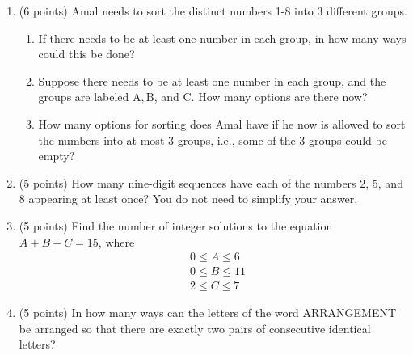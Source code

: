 \documentclass{article}
\begin{document}
\begin{enumerate}
  \item (6 points) Amal needs to sort the distinct numbers 1-8 into 3 different groups.
  \begin{enumerate}
    \item If there needs to be at least one number in each group, in how many ways could this be done?
    \begin{answer}
    \end{answer}
    \item Suppose there needs to be at least one number in each group, and the groups are labeled $\mathrm{A}, \mathrm{B}$, and C. How many options are there now?
    \begin{answer}
    \end{answer}
    \item How many options for sorting does Amal have if he now is allowed to sort the numbers into at most 3 groups, i.e., some of the 3 groups could be empty?
    \begin{answer}
    \end{answer}
  \end{enumerate}

  \item (5 points) How many nine-digit sequences have each of the numbers 2, 5, and 8 appearing at least once? You do not need to simplify your answer.
  \begin{answer}
  \end{answer}

  \item (5 points) Find the number of integer solutions to the equation $A+B+C=15$, where
  $$
  \begin{aligned}
  & 0 \leq A \leq 6 \\
  & 0 \leq B \leq 11 \\
  & 2 \leq C \leq 7
  \end{aligned}
  $$
  \begin{answer}
  \end{answer}

  \item (5 points) In how many ways can the letters of the word ARRANGEMENT be arranged so that there are exactly two pairs of consecutive identical letters?
  \begin{answer}
  \end{answer}
\end{enumerate}
\end{document}
